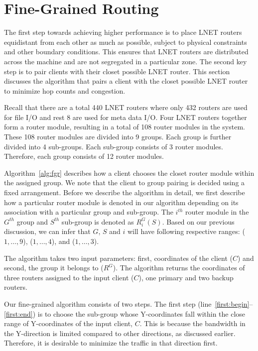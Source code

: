 \section{Fine-Grained Routing}


The first step towards achieving higher performance is to place LNET routers equidistant from each other as much as possible,
subject to physical constraints and other boundary conditions. This ensures that LNET routers are distributed across the machine
and are not segregated in a particular zone. The second key step is to pair clients with their closet possible LNET router. This 
section discusses the algorithm that pairs a client with the closet possible LNET router to minimize hop counts and congestion.

Recall that there are a total 440 LNET routers where only 432 routers are used for file I/O and rest 8 are used for meta data I/O.
Four LNET routers together form a router module, resulting in a total of 108 router modules in the system. These 108 router modules 
are divided into 9 groups. Each group is further divided into 4 sub-groups. Each sub-group consists of 3 router modules. Therefore, each 
group consists of 12 router modules.


Algorithm~\ref{alg:fgr} describes how a client chooses the closet router module within the assigned group. We note that
the client to group pairing is decided using a fixed arrangement. Before we describe the algorithm in detail, we first
describe how a particular router module is denoted in our algorithm depending on its association with a particular group and sub-group. The 
$i^{th}$ router module in the $G^{th}$ group and $S^{th}$ sub-group is denoted as $R^G_{i}(S)$. Based on 
our previous discussion, we can infer that $G$, $S$ and $i$ will have following respective ranges: ($1, \dots, 9$), ($1, \dots, 4$), 
and ($1, \dots, 3$).

The algorithm takes two input parameters: first, coordinates of the client ($C$) and second, the group it belongs to ($R^G$). The 
algorithm returns the coordinates of three routers assigned to the input client ($C$), one primary and two backup routers. 

Our fine-grained algorithm consists of two steps. The first step (line~\ref{first:begin}--\ref{first:end}) is to choose the sub-group whose 
Y-coordinates fall within the close range of Y-coordinates of the input client, $C$. This is because the bandwidth in the Y-direction is limited
compared to other directions, as discussed earlier. Therefore, it is desirable to minimize the traffic in that direction first. 


